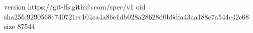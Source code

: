 version https://git-lfs.github.com/spec/v1
oid sha256:9290568c740721ec104ca4a86e1db028a28628d0b6dfa43aa188c7a544c42c68
size 87544

